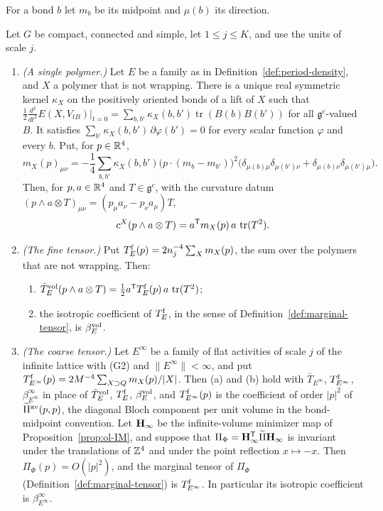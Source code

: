 For a bond $b$ let $m_b$ be its midpoint and $\mu(b)$ its direction.

\begin{lemma}\label{lem:period-vacpol}
Let $G$ be compact, connected and simple, let $1\le j\le K$, and use the units of scale $j$.
\begin{enumerate}[label=(\alph*)]
\item \emph{(A single polymer.)} Let $E$ be a family as in Definition~\ref{def:period-density}, and $X$ a polymer that is not wrapping. There is a unique real symmetric kernel $\kappa_X$ on the positively oriented bonds of a lift of $X$ such that $\frac12\frac{d^2}{dt^2}E(X,V_{tB})|_{t=0}=\sum_{b,b'}\kappa_X(b,b')\operatorname{tr}(B(b)B(b'))$ for all $\mathfrak g^c$-valued $B$. It satisfies $\sum_{b'}\kappa_X(b,b')\,\partial\varphi(b')=0$ for every scalar function $\varphi$ and every $b$. Put, for $p\in\mathbb R^4$,
\[
m_X(p)_{\mu\nu}=-\frac14\sum_{b,b'}\kappa_X(b,b')\big(p\cdot(m_b-m_{b'})\big)^2\big(\delta_{\mu(b)\mu}\delta_{\mu(b')\nu}+\delta_{\mu(b)\nu}\delta_{\mu(b')\mu}\big).
\]
Then, for $p,a\in\mathbb R^4$ and $T\in\mathfrak g^c$, with the curvature datum $(p\wedge a\otimes T)_{\mu\nu}=(p_\mu a_\nu-p_\nu a_\mu)T$,
\[
c^X(p\wedge a\otimes T)=a^{\sf T}m_X(p)\,a\,\operatorname{tr}(T^2).
\]
\item \emph{(The fine tensor.)} Put $T^{\rm f}_E(p)=2n_j^{-4}\sum_Xm_X(p)$, the sum over the polymers that are not wrapping. Then:
\begin{enumerate}[label=(\roman*)]
\item $\bar T^{\rm vol}_E(p\wedge a\otimes T)=\frac12a^{\sf T}T^{\rm f}_E(p)\,a\,\operatorname{tr}(T^2)$;
\item the isotropic coefficient of $T^{\rm f}_E$, in the sense of Definition~\ref{def:marginal-tensor}, is $\beta^{\rm vol}_E$.
\end{enumerate}
\item \emph{(The coarse tensor.)} Let $E^\infty$ be a family of flat activities of scale $j$ of the infinite lattice with (G2) and $\|E^\infty\|<\infty$, and put $T^{\rm f}_{E^\infty}(p)=2M^{-4}\sum_{X\supset Q}m_X(p)/|X|$. Then (a) and (b) hold with $\bar T_{E^\infty}$, $T^{\rm f}_{E^\infty}$, $\beta^\infty_{E^\infty}$ in place of $\bar T^{\rm vol}_E$, $T^{\rm f}_E$, $\beta^{\rm vol}_E$, and $T^{\rm f}_{E^\infty}(p)$ is the coefficient of order $|p|^2$ of $\widetilde\Pi^{\rm av}(p,p)$, the diagonal Bloch component per unit volume in the bond-midpoint convention. Let $\mathbf H_\infty$ be the infinite-volume minimizer map of Proposition~\ref{prop:ol-IM}, and suppose that $\Pi_\Phi=\mathbf H_\infty^{\sf T}\widetilde\Pi\mathbf H_\infty$ is invariant under the translations of $\mathbb Z^4$ and under the point reflection $x\mapsto-x$. Then $\Pi_\Phi(p)=O(|p|^2)$, and the marginal tensor of $\Pi_\Phi$ (Definition~\ref{def:marginal-tensor}) is $T^{\rm f}_{E^\infty}$. In particular its isotropic coefficient is $\beta^\infty_{E^\infty}$.

\end{enumerate}
\end{lemma}
